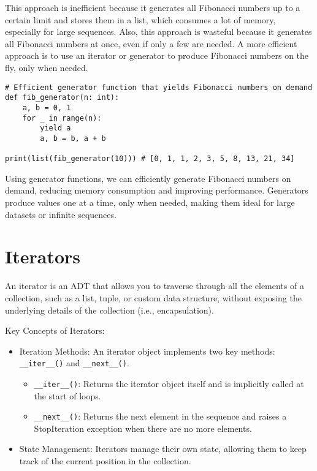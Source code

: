 \documentclass[oneside,11pt,dvipsnames]{book}
\newcommand{\code}[1]{\texttt{#1}}
\begin{document}
This approach is inefficient because it generates all Fibonacci numbers up to a certain limit and stores them in a list, which consumes a lot of memory, especially for large sequences. Also, this approach is wasteful because it generates all Fibonacci numbers at once, even if only a few are needed.
A more efficient approach is to use an iterator or generator to produce Fibonacci numbers on the fly, only when needed.

\begin{lstlisting}
# Efficient generator function that yields Fibonacci numbers on demand
def fib_generator(n: int):
    a, b = 0, 1
    for _ in range(n):
        yield a
        a, b = b, a + b

print(list(fib_generator(10))) # [0, 1, 1, 2, 3, 5, 8, 13, 21, 34]
\end{lstlisting}

Using generator functions, we can efficiently generate Fibonacci numbers on demand, reducing memory consumption and improving performance. Generators produce values one at a time, only when needed, making them ideal for large datasets or infinite sequences.


\section{Iterators}

An iterator is an ADT that allows you to traverse through all the elements of a collection, such as a list, tuple, or custom data structure, without exposing the underlying details of the collection (i.e., encapsulation). 

Key Concepts of Iterators:
\begin{itemize}
\item Iteration Methods: An iterator object implements two key methods: \code{\_\_iter\_\_()} and \code{\_\_next\_\_()}.
\begin{itemize}
    \item \code{\_\_iter\_\_()}: Returns the iterator object itself and is implicitly called at the start of loops.
	\item \code{\_\_next\_\_()}: Returns the next element in the sequence and raises a StopIteration exception when there are no more elements.
\end{itemize}
\item State Management: Iterators manage their own state, allowing them to keep track of the current position in the collection.
\end{itemize}
\end{document}
